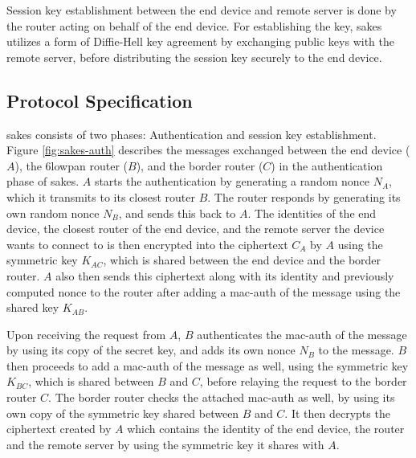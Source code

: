 Session key establishment between the end device and remote server is done by the router acting on behalf of the end device. For establishing the key, \gls{sakes} utilizes a form of Diffie-Hell key agreement by exchanging public keys with the remote server, before distributing the session key securely to the end device.




\subsection{Protocol Specification}

\gls{sakes} consists of two phases: Authentication and session key establishment. Figure \ref{fig:sakes-auth} describes the messages exchanged between the end device ($A$), the \gls{6lowpan} router ($B$), and the border router ($C$) in the authentication phase of \gls{sakes}. $A$ starts the authentication by generating a random nonce $N_A$, which it transmits to its closest router $B$. The router responds by generating its own random nonce $N_B$, and sends this back to $A$. The identities of the end device, the closest router of the end device, and the remote server the device wants to connect to is then encrypted into the ciphertext $C_A$ by $A$ using the symmetric key $K_{AC}$, which is shared between the end device and the border router. $A$ also then sends this ciphertext along with its identity and previously computed nonce to the router after adding a \gls{mac-auth} of the message using the shared key $K_{AB}$.

Upon receiving the request from $A$, $B$ authenticates the \gls{mac-auth} of the message by using its copy of the secret key, and adds its own nonce $N_B$ to the message. $B$ then proceeds to add a \gls{mac-auth} of the message as well, using the symmetric key $K_{BC}$, which is shared between $B$ and $C$, before relaying the request to the border router $C$. The border router checks the attached \gls{mac-auth} as well, by using its own copy of the symmetric key shared between $B$ and $C$. It then decrypts the ciphertext created by $A$ which contains the identity of the end device, the router and the remote server by using the symmetric key it shares with $A$.


